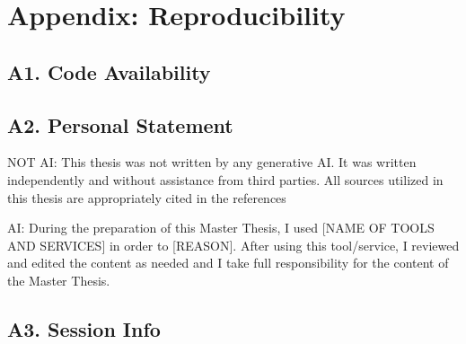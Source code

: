 

\chapter*{Appendix: Reproducibility}
% 
% 
%  
% 
% 
\section*{A1. Code Availability}
\section*{A2. Personal Statement}

NOT AI:
This thesis was not written by any generative AI. It was written independently and
without assistance from third parties. All sources utilized in this thesis are appropriately cited in the references

AI:
During the preparation of this Master Thesis, I used [NAME OF TOOLS AND SERVICES] in order to [REASON]. After using this tool/service, I reviewed and edited the content as needed and I take full responsibility for the content of the Master Thesis.

\section*{A3. Session Info}


